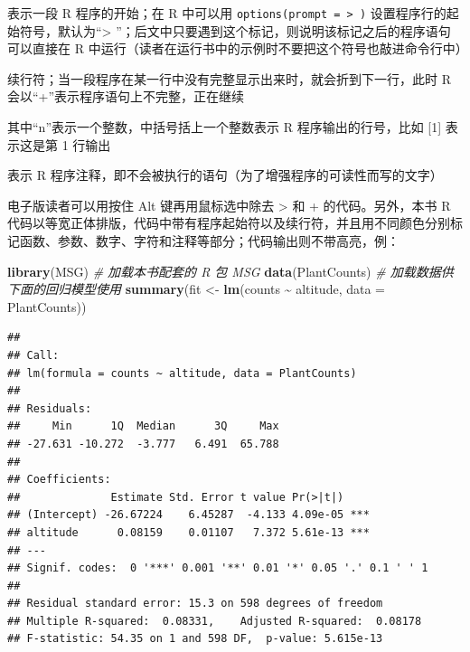 \documentclass[
  b5paper,
  UTF8,twoside]{book}
\newenvironment{Shaded}{\begin{snugshade}}{\end{snugshade}}
\newcommand{\AttributeTok}[1]{\textcolor[rgb]{0.13,0.29,0.53}{#1}}
\newcommand{\CommentTok}[1]{\textcolor[rgb]{0.56,0.35,0.01}{\textit{#1}}}
\newcommand{\FunctionTok}[1]{\textcolor[rgb]{0.13,0.29,0.53}{\textbf{#1}}}
\newcommand{\NormalTok}[1]{#1}
\newcommand{\OtherTok}[1]{\textcolor[rgb]{0.56,0.35,0.01}{#1}}
\newcommand{\SpecialCharTok}[1]{\textcolor[rgb]{0.81,0.36,0.00}{\textbf{#1}}}
\providecommand{\tightlist}{%
  \setlength{\itemsep}{0pt}\setlength{\parskip}{0pt}}
\begin{document}
\begin{description}
\tightlist
\item[\texttt{\textgreater{}}]
表示一段 R 程序的开始；在 R 中可以用 \texttt{options(prompt\ =\ \textquotesingle{}\textgreater{}\ \textquotesingle{})} 设置程序行的起始符号，默认为``\textgreater{} ''；后文中只要遇到这个标记，则说明该标记之后的程序语句可以直接在 R 中运行（读者在运行书中的示例时不要把这个符号也敲进命令行中）
\item[\texttt{+}]
续行符；当一段程序在某一行中没有完整显示出来时，就会折到下一行，此时 R 会以``+''表示程序语句上不完整，正在继续
\item[\texttt{{[}n{]}}]
其中``n''表示一个整数，中括号括上一个整数表示 R 程序输出的行号，比如 {[}1{]} 表示这是第 1 行输出
\item[\texttt{\#}]
表示 R 程序注释，即不会被执行的语句（为了增强程序的可读性而写的文字）
\end{description}

电子版读者可以用按住 Alt 键再用鼠标选中除去 \textgreater{} 和 + 的代码。另外，本书 R 代码以等宽正体排版，代码中带有程序起始符以及续行符，并且用不同颜色分别标记函数、参数、数字、字符和注释等部分；代码输出则不带高亮，例：

\begin{Shaded}
\begin{Highlighting}[]
\FunctionTok{library}\NormalTok{(MSG) }\CommentTok{\# 加载本书配套的 R 包 MSG}
\FunctionTok{data}\NormalTok{(PlantCounts) }\CommentTok{\# 加载数据供下面的回归模型使用}
\FunctionTok{summary}\NormalTok{(fit }\OtherTok{\textless{}{-}} \FunctionTok{lm}\NormalTok{(counts }\SpecialCharTok{\textasciitilde{}}\NormalTok{ altitude, }\AttributeTok{data =}\NormalTok{ PlantCounts))}
\end{Highlighting}
\end{Shaded}

\begin{verbatim}
## 
## Call:
## lm(formula = counts ~ altitude, data = PlantCounts)
## 
## Residuals:
##     Min      1Q  Median      3Q     Max 
## -27.631 -10.272  -3.777   6.491  65.788 
## 
## Coefficients:
##              Estimate Std. Error t value Pr(>|t|)    
## (Intercept) -26.67224    6.45287  -4.133 4.09e-05 ***
## altitude      0.08159    0.01107   7.372 5.61e-13 ***
## ---
## Signif. codes:  0 '***' 0.001 '**' 0.01 '*' 0.05 '.' 0.1 ' ' 1
## 
## Residual standard error: 15.3 on 598 degrees of freedom
## Multiple R-squared:  0.08331,    Adjusted R-squared:  0.08178 
## F-statistic: 54.35 on 1 and 598 DF,  p-value: 5.615e-13
\end{verbatim}
\end{document}
